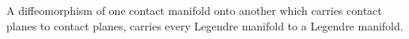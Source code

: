 A diffeomorphism of one contact manifold onto another which carries contact planes to contact planes, carries every Legendre manifold to a Legendre manifold.
